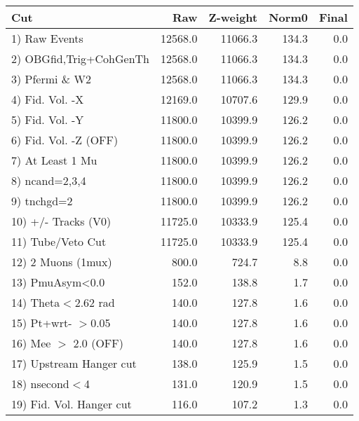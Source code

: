  \begin{table}[h!]\centering
 \begin{tabular}{||l||r|r|r|r||}
 \hline
 \hline
 Cut & Raw & Z-weight & Norm0 & Final \\
 \hline
  1) Raw Events           &     12568.0 &     11066.3 &       134.3 &         0.0 \\
  2) OBGfid,Trig+CohGenTh &     12568.0 &     11066.3 &       134.3 &         0.0 \\
  3) Pfermi \& W2         &     12568.0 &     11066.3 &       134.3 &         0.0 \\
  4) Fid. Vol. -X         &     12169.0 &     10707.6 &       129.9 &         0.0 \\
  5) Fid. Vol. -Y         &     11800.0 &     10399.9 &       126.2 &         0.0 \\
  6) Fid. Vol. -Z (OFF)   &     11800.0 &     10399.9 &       126.2 &         0.0 \\
  7) At Least 1 Mu        &     11800.0 &     10399.9 &       126.2 &         0.0 \\
  8) ncand=2,3,4          &     11800.0 &     10399.9 &       126.2 &         0.0 \\
  9) tnchgd=2             &     11800.0 &     10399.9 &       126.2 &         0.0 \\
 10) +/- Tracks (V0)      &     11725.0 &     10333.9 &       125.4 &         0.0 \\
 11) Tube/Veto Cut        &     11725.0 &     10333.9 &       125.4 &         0.0 \\
 12) 2 Muons (1mux)       &       800.0 &       724.7 &         8.8 &         0.0 \\
 13) PmuAsym<0.0          &       152.0 &       138.8 &         1.7 &         0.0 \\
 14) Theta$<$2.62 rad     &       140.0 &       127.8 &         1.6 &         0.0 \\
 15) Pt+wrt- $>$0.05      &       140.0 &       127.8 &         1.6 &         0.0 \\
 16) Mee $>$ 2.0  (OFF)   &       140.0 &       127.8 &         1.6 &         0.0 \\
 17) Upstream Hanger cut  &       138.0 &       125.9 &         1.5 &         0.0 \\
 18) nsecond$<$4          &       131.0 &       120.9 &         1.5 &         0.0 \\
 19) Fid. Vol. Hanger cut &       116.0 &       107.2 &         1.3 &         0.0 \\

\end{tabular}
\end{table}
